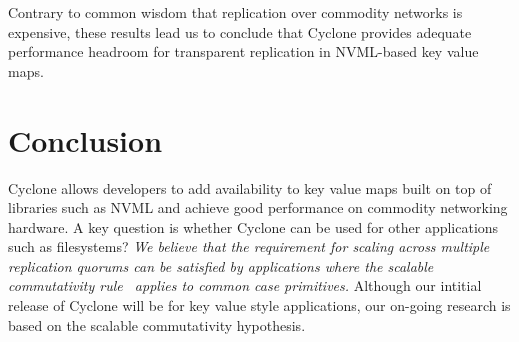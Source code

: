\documentclass[10pt, preprint]{sigplanconf}
\begin{document}
Contrary to common wisdom that replication over commodity networks is expensive,
these results lead us to conclude that Cyclone provides adequate performance
headroom for transparent replication in NVML-based key value maps.

\section{Conclusion}
Cyclone allows developers to add availability to key value maps built on top of
libraries such as NVML and achieve good performance on commodity networking
hardware. A key question is whether Cyclone can be used for other applications
such as filesystems? \emph{We believe that the requirement for scaling across
  multiple replication quorums can be satisfied by applications where the
  scalable commutativity rule~\cite{scalable_commutativity} applies to common
  case primitives.} Although our intitial release of Cyclone will be for key
value style applications, our on-going research is based on the scalable
commutativity hypothesis.
\newcommand\myurl[2]{\url{#1}}


\end{document}
